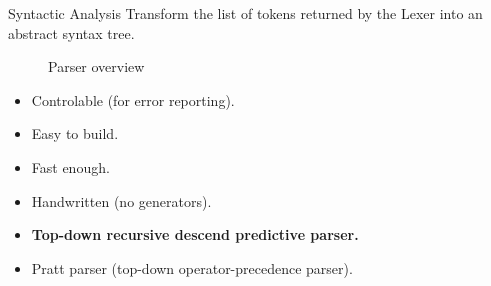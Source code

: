 \begin{slide}
    \begin{block}{Syntactic Analysis}
        Transform the list of tokens returned by the Lexer into an abstract syntax tree.
    \end{block}
    \vfill
    \begin{figure}[H]
        \centering
        \caption{Parser overview}
    \end{figure}
\end{slide}
\begin{slide}
    \begin{itemize}
        \item Controlable (for error reporting).
        \item Easy to build.
        \item Fast enough.
        \item Handwritten (no generators).
    \end{itemize}
    \begin{itemize}
        \item \textbf{Top-down recursive descend predictive parser.}
        \item Pratt parser (top-down operator-precedence parser).
    \end{itemize}
\end{slide}
